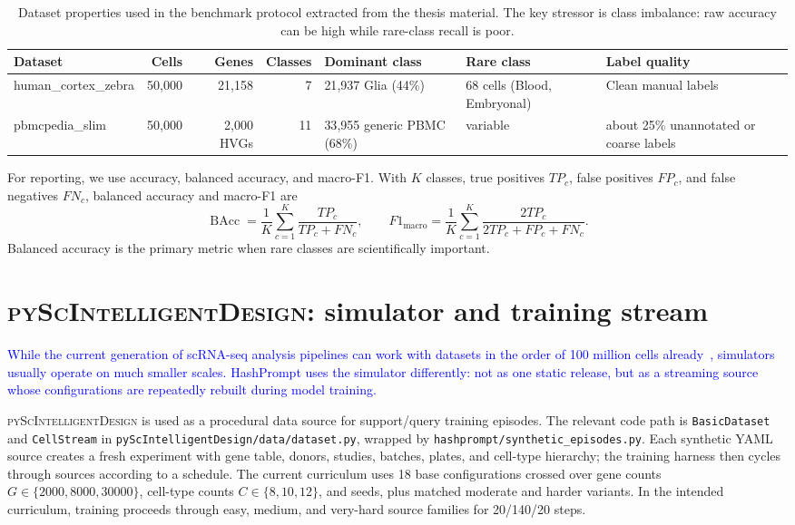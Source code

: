 \documentclass{article}
\newcommand{\phflo}[1]{\textcolor{blue}{#1}}
\begin{document}
\begin{table}[t]
\centering
\small
\setlength{\tabcolsep}{4pt}
\caption{Dataset properties used in the benchmark protocol extracted from the thesis material. The key stressor is class imbalance: raw accuracy can be high while rare-class recall is poor.}
\label{tab:dataset_properties}
\begin{tabularx}{\textwidth}{@{}lrrrXXX@{}}
\toprule
\textbf{Dataset} & \textbf{Cells} & \textbf{Genes} & \textbf{Classes} & \textbf{Dominant class} & \textbf{Rare class} & \textbf{Label quality} \\
\midrule
human\_cortex\_zebra & 50{,}000 & 21{,}158 & 7 & 21{,}937 Glia (44\%) & 68 cells (Blood, Embryonal) & Clean manual labels \\
pbmcpedia\_slim & 50{,}000 & 2{,}000 HVGs & 11 & 33{,}955 generic PBMC (68\%) & variable & about 25\% unannotated or coarse labels \\
\bottomrule
\end{tabularx}
\end{table}

For reporting, we use accuracy, balanced accuracy, and macro-F1. With \(K\) classes, true positives \(TP_c\), false positives \(FP_c\), and false negatives \(FN_c\), balanced accuracy and macro-F1 are
\begin{equation}
    \operatorname{BAcc}=\frac{1}{K}\sum_{c=1}^{K}\frac{TP_c}{TP_c+FN_c},
    \qquad
    F1_{\operatorname{macro}}=\frac{1}{K}\sum_{c=1}^{K}\frac{2TP_c}{2TP_c+FP_c+FN_c}.
\end{equation}
Balanced accuracy is the primary metric when rare classes are scientifically important.

\section{\textsc{pyScIntelligentDesign}: simulator and training stream}

\phflo{While the current generation of scRNA-seq analysis pipelines can work with datasets in the order of 100 million cells already~\cite{wolf2018scanpy, zhang2025tahoe}, simulators usually operate on much smaller scales. HashPrompt uses the simulator differently: not as one static release, but as a streaming source whose configurations are repeatedly rebuilt during model training.}

\textsc{pyScIntelligentDesign} is used as a procedural data source for support/query training episodes. The relevant code path is \texttt{BasicDataset} and \texttt{CellStream} in \texttt{pyScIntelligentDesign/data/dataset.py}, wrapped by \texttt{hashprompt/synthetic\_episodes.py}. Each synthetic YAML source creates a fresh experiment with gene table, donors, studies, batches, plates, and cell-type hierarchy; the training harness then cycles through sources according to a schedule. The current curriculum uses 18 base configurations crossed over gene counts \(G\in\{2000,8000,30000\}\), cell-type counts \(C\in\{8,10,12\}\), and seeds, plus matched moderate and harder variants. In the intended curriculum, training proceeds through easy, medium, and very-hard source families for 20/140/20 steps.
\end{document}
